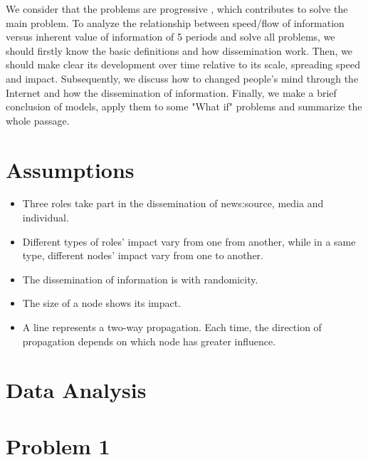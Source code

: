  
 \par We consider that the problems are progressive , which contributes to solve the main problem. To analyze the relationship between speed/flow of information versus inherent value of information of 5 periods and solve all problems, we should firstly know the basic definitions and how dissemination work. Then, we should make clear its development over time relative to its scale, spreading speed and impact. Subsequently, we discuss how to changed people's mind through the Internet and how the dissemination of information. Finally, we make a brief conclusion of models, apply them to some "What if" problems and summarize the whole passage.
 
 




\section  {Assumptions}
\begin{itemize}
	\item Three roles take part in the dissemination of news:source, media and individual.
	\item Different types of roles' impact vary from one from another, while in a same type, different nodes' impact vary from one to another.
	\item The dissemination of information is with randomicity.
	\item The size of a node shows its impact.
	\item A line represents a two-way propagation. Each time, the direction of propagation depends on which node has greater influence.
\end{itemize}

\section  {Data Analysis}

\section{Problem 1} 
